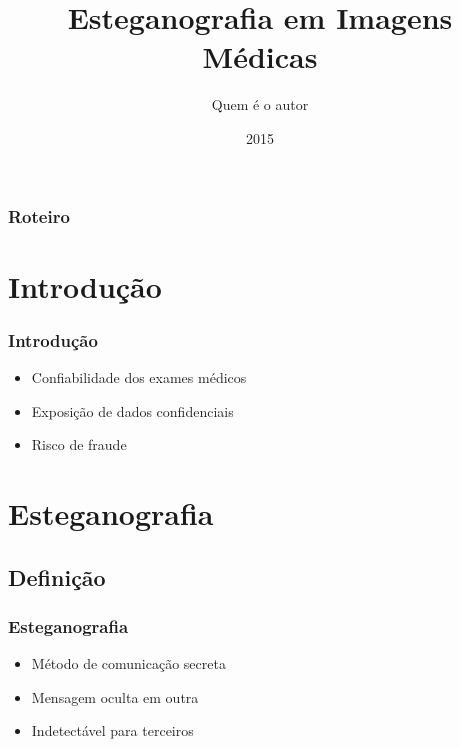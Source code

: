 \documentclass{beamer}
\title{Esteganografia em Imagens Médicas} %
\author{Quem é o autor} %
\institute[USP] %
{
Orientador: Quem? \\ %
\medskip
\textit{} %
}
\date{2015} %
\begin{document}
\begin{frame}
\titlepage %
\end{frame}

\begin{frame}
\frametitle{Roteiro} %
\tableofcontents %
\end{frame}


\section{Introdução} 

\begin{frame}
\frametitle{Introdução}
\begin{itemize}
\item Confiabilidade dos exames médicos \newline
\item Exposição de dados confidenciais \newline
\item Risco de fraude 

\end{itemize}

\end{frame}



\section{Esteganografia}
\subsection{Definição}
\begin{frame}
\frametitle{Esteganografia}
\begin{itemize}
\item Método de comunicação secreta
\item Mensagem oculta em outra
\item Indetectável para terceiros
\end{itemize}
\end{frame}
\end{document}
